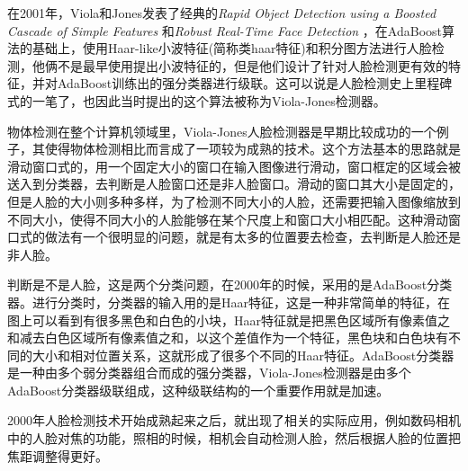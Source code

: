 在2001年，Viola和Jones发表了经典的\textit{Rapid Object Detection using a Boosted Cascade of Simple Features} \cite{repid}和\textit{Robust Real-Time Face Detection} \cite{robust}，在AdaBoost算法的基础上，使用Haar-like小波特征(简称类haar特征)和积分图方法进行人脸检测，他俩不是最早使用提出小波特征的，但是他们设计了针对人脸检测更有效的特征，并对AdaBoost训练出的强分类器进行级联。这可以说是人脸检测史上里程碑式的一笔了，也因此当时提出的这个算法被称为Viola-Jones检测器。

物体检测在整个计算机领域里，Viola-Jones人脸检测器是早期比较成功的一个例子，其使得物体检测相比而言成了一项较为成熟的技术。这个方法基本的思路就是滑动窗口式的，用一个固定大小的窗口在输入图像进行滑动，窗口框定的区域会被送入到分类器，去判断是人脸窗口还是非人脸窗口。滑动的窗口其大小是固定的，但是人脸的大小则多种多样，为了检测不同大小的人脸，还需要把输入图像缩放到不同大小，使得不同大小的人脸能够在某个尺度上和窗口大小相匹配。这种滑动窗口式的做法有一个很明显的问题，就是有太多的位置要去检查，去判断是人脸还是非人脸。

判断是不是人脸，这是两个分类问题，在2000年的时候，采用的是AdaBoost分类器。进行分类时，分类器的输入用的是Haar特征，这是一种非常简单的特征，在图上可以看到有很多黑色和白色的小块，Haar特征就是把黑色区域所有像素值之和减去白色区域所有像素值之和，以这个差值作为一个特征，黑色块和白色块有不同的大小和相对位置关系，这就形成了很多个不同的Haar特征。AdaBoost分类器是一种由多个弱分类器组合而成的强分类器，Viola-Jones检测器是由多个AdaBoost分类器级联组成，这种级联结构的一个重要作用就是加速。

2000年人脸检测技术开始成熟起来之后，就出现了相关的实际应用，例如数码相机中的人脸对焦的功能，照相的时候，相机会自动检测人脸，然后根据人脸的位置把焦距调整得更好。